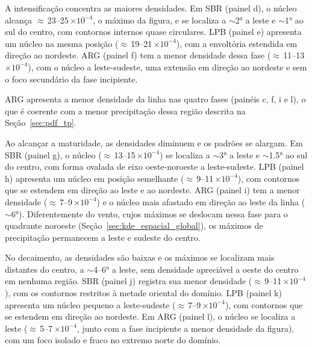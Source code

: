 A intensificação concentra as maiores densidades. Em SBR (painel d), o núcleo alcança ${\approx}$\,23--25\,$\times10^{-4}$, o máximo da figura, e se localiza a ${\sim}$2° a leste e ${\sim}$1° ao sul do centro, com contornos internos quase circulares. LPB (painel e) apresenta um núcleo na mesma posição (${\approx}$\,19--21\,$\times10^{-4}$), com a envoltória estendida em direção ao nordeste. ARG (painel f) tem a menor densidade dessa fase (${\approx}$\,11--13\,$\times10^{-4}$), com o núcleo a leste-sudeste, uma extensão em direção ao nordeste e sem o foco secundário da fase incipiente.

ARG apresenta a menor densidade da linha nas quatro fases (painéis c, f, i e l), o que é coerente com a menor precipitação dessa região descrita na Seção~\ref{sec:pdf_tp}.

Ao alcançar a maturidade, as densidades diminuem e os padrões se alargam. Em SBR (painel g), o núcleo (${\approx}$\,13--15\,$\times10^{-4}$) se localiza a ${\sim}$3° a leste e ${\sim}$1.5° ao sul do centro, com forma ovalada de eixo oeste-noroeste a leste-sudeste. LPB (painel h) apresenta um núcleo em posição semelhante (${\approx}$\,9--11\,$\times10^{-4}$), com contornos que se estendem em direção ao leste e ao nordeste. ARG (painel i) tem a menor densidade (${\approx}$\,7--9\,$\times10^{-4}$) e o núcleo mais afastado em direção ao leste da linha (${\sim}$6°). Diferentemente do vento, cujos máximos se deslocam nessa fase para o quadrante noroeste (Seção~\ref{sec:kde_espacial_global}), os máximos de precipitação permanecem a leste e sudeste do centro.

No decaimento, as densidades são baixas e os máximos se localizam mais distantes do centro, a ${\sim}$4--6° a leste, sem densidade apreciável a oeste do centro em nenhuma região. SBR (painel j) registra sua menor densidade (${\approx}$\,9--11\,$\times10^{-4}$), com os contornos restritos à metade oriental do domínio. LPB (painel k) apresenta um núcleo pequeno a leste-sudeste (${\approx}$\,7--9\,$\times10^{-4}$), com contornos que se estendem em direção ao nordeste. Em ARG (painel l), o núcleo se localiza a leste (${\approx}$\,5--7\,$\times10^{-4}$, junto com a fase incipiente a menor densidade da figura), com um foco isolado e fraco no extremo norte do domínio.

